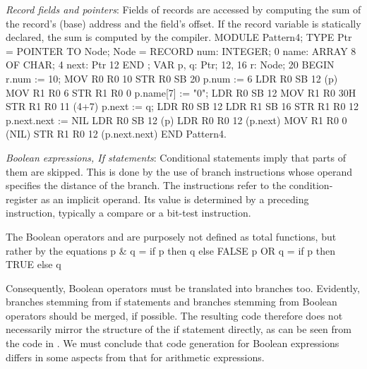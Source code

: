 \noindent {} \emph{Record fields and pointers}: Fields of records are accessed by computing the sum of the record's (base) address and the field's offset. If the record variable is statically declared, the sum is computed by the compiler.
\begintt
MODULE Pattern4;
  TYPE Ptr = POINTER TO Node;
    Node = RECORD num: INTEGER;  0
      name: ARRAY 8 OF CHAR;     4
      next: Ptr                  12
    END ;                        
  VAR p, q: Ptr;                 12, 16
    r: Node;                     20
BEGIN    
  r.num := 10;                   MOV R0 R0 10
                                 STR R0 SB 20
  p.num := 6                     LDR R0 SB 12 (p)
                                 MOV R1 R0 6
                                 STR R1 R0 0
  p.name[7] := "0";              LDR R0 SB 12
                                 MOV R1 R0 30H
                                 STR R1 R0 11 (4+7)
  p.next := q;                   LDR R0 SB 12
                                 LDR R1 SB 16
                                 STR R1 R0 12
  p.next.next := NIL             LDR R0 SB 12 (p)
                                 LDR R0 R0 12 (p.next)
                                 MOV R1 R0 0  (NIL)
                                 STR R1 R0 12 (p.next.next)
END Pattern4.
\endtt

\noindent {} \emph{Boolean expressions, If statements}: Conditional statements imply that parts of them are skipped. This is done by the use of branch instructions whose operand specifies the distance of the branch. The instructions refer to the condition-register as an implicit operand. Its value is determined by a preceding instruction, typically a compare or a bit-test instruction.

The Boolean operators \code{\&} and  are purposely not defined as total functions, but rather by the equations
\begintt
  p & q  = if p then q else FALSE
  p OR q = if p then TRUE else q
\endtt

\noindent Consequently, Boolean operators must be translated into branches too. Evidently, branches stemming from if statements and branches stemming from Boolean operators should be merged, if possible. The resulting code therefore does not necessarily mirror the structure of the if statement directly, as can be seen from the code in . We must conclude that code generation for Boolean expressions differs in some aspects from that for arithmetic expressions.

